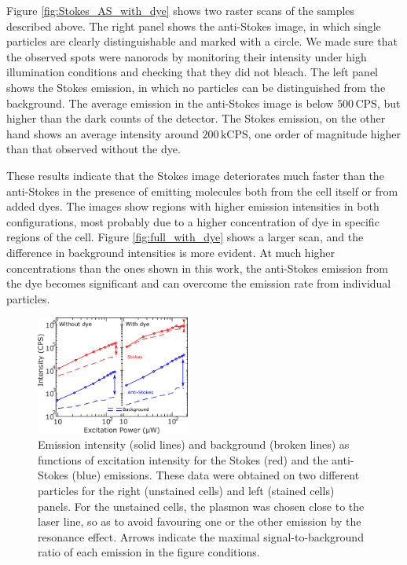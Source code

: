 \documentclass[journal=nalefd,manuscript=letter]{achemso}
\newcommand{\CPS}{\ensuremath{\,\textrm{CPS}}}
\newcommand{\kCPS}{\ensuremath{\,\textrm{kCPS}}}
\begin{document}
Figure \ref{fig:Stokes_AS_with_dye} shows two raster scans of the samples
described above. The right panel shows the anti-Stokes image, in which single
particles are clearly distinguishable and marked with a circle. We made sure
that the observed spots were nanorods by monitoring their intensity under high
illumination conditions and checking that they did not bleach. The left panel
shows the Stokes emission, in which no particles can be distinguished from the
background. The average emission in the anti-Stokes image is below $500\CPS$,
but higher than the dark counts of the detector. The Stokes emission, on the
other hand shows an average intensity around $200\kCPS$, one order of magnitude
higher than that observed without the dye.

These results indicate that the Stokes image deteriorates much faster than the
anti-Stokes in the presence of emitting molecules both from the cell itself or
from added dyes. The images show regions with higher emission intensities in
both configurations, most probably due to a higher concentration of dye in
specific regions of the cell. Figure \ref{fig:full_with_dye} shows a larger
scan, and the difference in background intensities is more evident. At much
higher concentrations than the ones shown in this work, the anti-Stokes emission
from the dye becomes significant and can overcome the emission rate from
individual particles.

\begin{figure}[htp] \centering
\includegraphics[width=0.45\textwidth]{Figures/06_Power_Intensity/power_intensity.png}
\caption{Emission intensity (solid lines) and background (broken lines) as
functions of excitation intensity for the Stokes (red) and the anti-Stokes
(blue) emissions. These data were obtained on two different particles for the
right (unstained cells) and left (stained cells) panels. For the unstained
cells, the plasmon was chosen close to the laser line, so as to avoid favouring
one or the other emission by the resonance effect. Arrows indicate the maximal
signal-to-background ratio of each emission in the figure conditions. }
	\label{fig:power_intensity}
\end{figure}
\end{document}
